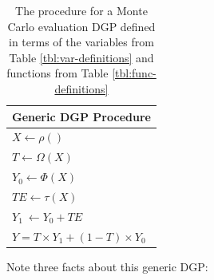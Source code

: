 \documentclass[../main.tex]{subfiles}
\begin{document}
\begin{table}[H]
\centering
\begin{tabular}{|l|}
\hline
\textbf{Generic DGP Procedure} \\ \hline

 \( X \leftarrow  \rho  \left(  \right)  \) \\

 \( T \leftarrow  \Omega  \left( X \right)  \) \\

 \( Y_{0} \leftarrow  \Phi  \left( X \right)  \) \\

 \( TE \leftarrow  \tau \left( X \right)  \) \\

 \( Y_{1}~ \leftarrow Y_{0}+ TE \) \\

 \( Y = T \times Y_{1}+  \left( 1-T \right)  \times Y_{0} \) \\
 \hline
\end{tabular}
\caption{The procedure for a Monte Carlo evaluation DGP defined in terms of the variables from Table \ref{tbl:var-definitions} and functions from Table \ref{tbl:func-definitions}}
\label{tbl:generic-dgp-definition}
\end{table}

\vspace{\baselineskip}

Note three facts about this generic DGP:\par
\end{document}
